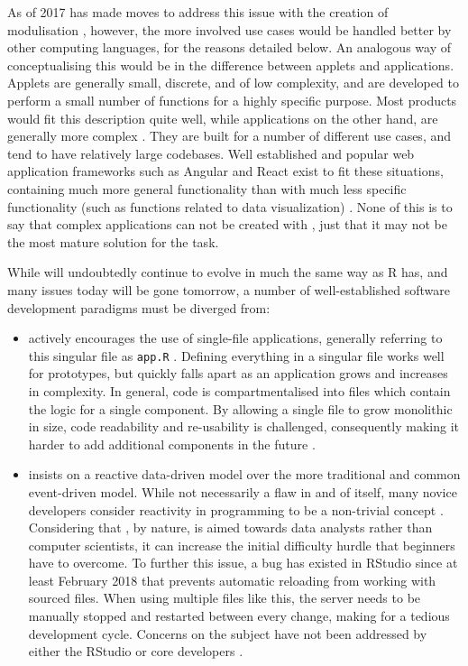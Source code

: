 As of 2017  has made moves to address this issue with the creation of modulisation \citep{cheng_shiny_2017}, however, the more involved use cases would be handled better by other computing languages, for the reasons detailed below. An analogous way of conceptualising this would be in the difference between applets and applications. Applets are generally small, discrete, and of low complexity, and are developed to perform a small number of functions for a highly specific purpose. Most  products would fit this description quite well, while applications on the other hand, are generally more complex \citep{fayram_functional_2011}. They are built for a number of different use cases, and tend to have relatively large codebases. Well established and popular web application frameworks such as Angular and React exist to fit these situations, containing much more general functionality than  with much less specific functionality (such as functions related to data visualization) \citep{mitchell_shiny_2018}. None of this is to say that complex applications can not be created with , just that it may not be the most mature solution for the task.

While  will undoubtedly continue to evolve in much the same way as R has, and many issues today will be gone tomorrow, a number of well-established software development paradigms must be diverged from:

\begin{itemize}
	\item {} actively encourages the use of single-file applications, generally referring to this singular file as \texttt{app.R} \citep{chang_shiny_2018}.  Defining everything in a singular file works well for prototypes, but quickly falls apart as an application grows and increases in complexity.  In general, code is compartmentalised into files which contain the logic for a single component.  By allowing a single file to grow monolithic in size, code readability and re-usability is challenged, consequently making it harder to add additional components in the future \citep{fayram_functional_2011}.
	\item {} insists on a reactive data-driven model over the more traditional and common event-driven model.  While not necessarily a flaw in and of itself, many novice developers consider reactivity in programming to be a non-trivial concept \citep{fayram_functional_2011}.  Considering that , by nature, is aimed towards data analysts rather than computer scientists, it can increase the initial difficulty hurdle that beginners have to overcome.  To further this issue, a bug has existed in RStudio since at least February 2018 that prevents automatic reloading from working with sourced files. When using multiple files like this, the server needs to be manually stopped and restarted between every change, making for a tedious development cycle. Concerns on the subject have not been addressed by either the RStudio or  core developers \citep{hansen_rstudio_2018}.
\end{itemize}


